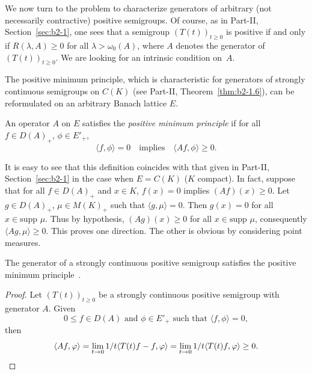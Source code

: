 We now turn to the problem to characterize generators of arbitrary (not necessarily contractive) positive semigroups.
Of course, as in Part-II, Section~\ref{sec:b2-1}, 
one sees that a semigroup $(T(t))_{t \geq 0}$ is positive if and only if\/ $R(\lambda,A) \geq 0$ for all $\lambda > \omega_{0}(A)$, where $A$ denotes the generator of\/ $(T(t))_{t \geq 0}$.
We are looking for an intrinsic condition on~$A$.

The positive minimum principle, which is characteristic for generators of strongly continuous semigroups on $C(K)$ (see 
Part-II, Theorem~\ref{thm:b2-1.6}), can be reformulated on an arbitrary Banach lattice $E$.
\begin{definition}\label{def:c2-1.6}
%
An operator $A$ on $E$ satisfies the \emph{positive minimum principle} if for all $f \in D(A)_{+}$, $\phi \in E'_{+}$,
\begin{equation}\label{eq:c2-P} \tag{P}
\langle f,\phi \rangle = 0 \quad \text{implies} \quad \langle Af,\phi \rangle \geq 0.
\end{equation}
\end{definition}
\begin{remark*}\label{rem:c2-1.6}
%
It is easy to see that this definition coincides with that given in Part-II, Section~\ref{sec:b2-1} 
in the case when $E = C(K)$ ($K$ compact).
In fact, suppose that for all $f \in D(A)_{+}$ and $x \in K$, $f(x) = 0$ implies $(Af)(x) \geq 0$.
Let $g \in D(A)_{+}$, $\mu \in M(K)_{+}$ such that $\langle g,\mu \rangle = 0$.
Then $g(x) = 0$ for all $x \in \text{supp } \mu$.
Thus by hypothesis, $(Ag)(x) \geq 0$ for all $x \in \text{supp } \mu$,
consequently $\langle Ag,\mu \rangle \geq 0$.
This proves one direction.
The other is obvious by considering point measures.
\end{remark*}
\begin{proposition}\label{prop:c2-1.7}
%
The generator of a strongly continuous positive semigroup satisfies the positive minimum 
principle~.
\end{proposition}
\begin{proof}
Let $(T(t))_{t \geq 0}$ be a strongly continuous positive semigroup with generator $A$. Given
\[
0 \leq f \in D(A) \text{ and } \phi \in E'_{+} \text{ such that } \langle f,\phi \rangle = 0 ,
\]
then 
\begin{equation*}
\langle Af,\phi \rangle = \lim_{t \to 0} 1/t \langle T(t)f - f, \phi \rangle = \lim_{t \to 0} 1/t \langle T(t)f, \phi \rangle \geq 0 .
\qedhere
\end{equation*}
\end{proof}

